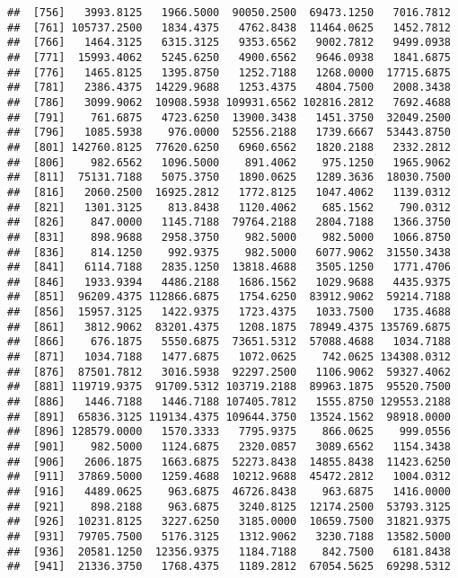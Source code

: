 \documentclass[]{article}
\begin{document}
\begin{verbatim}
##  [756]   3993.8125   1966.5000  90050.2500  69473.1250   7016.7812
##  [761] 105737.2500   1834.4375   4762.8438  11464.0625   1452.7812
##  [766]   1464.3125   6315.3125   9353.6562   9002.7812   9499.0938
##  [771]  15993.4062   5245.6250   4900.6562   9646.0938   1841.6875
##  [776]   1465.8125   1395.8750   1252.7188   1268.0000  17715.6875
##  [781]   2386.4375  14229.9688   1253.4375   4804.7500   2008.3438
##  [786]   3099.9062  10908.5938 109931.6562 102816.2812   7692.4688
##  [791]    761.6875   4723.6250  13900.3438   1451.3750  32049.2500
##  [796]   1085.5938    976.0000  52556.2188   1739.6667  53443.8750
##  [801] 142760.8125  77620.6250   6960.6562   1820.2188   2332.2812
##  [806]    982.6562   1096.5000    891.4062    975.1250   1965.9062
##  [811]  75131.7188   5075.3750   1890.0625   1289.3636  18030.7500
##  [816]   2060.2500  16925.2812   1772.8125   1047.4062   1139.0312
##  [821]   1301.3125    813.8438   1120.4062    685.1562    790.0312
##  [826]    847.0000   1145.7188  79764.2188   2804.7188   1366.3750
##  [831]    898.9688   2958.3750    982.5000    982.5000   1066.8750
##  [836]    814.1250    992.9375    982.5000   6077.9062  31550.3438
##  [841]   6114.7188   2835.1250  13818.4688   3505.1250   1771.4706
##  [846]   1933.9394   4486.2188   1686.1562   1029.9688   4435.9375
##  [851]  96209.4375 112866.6875   1754.6250  83912.9062  59214.7188
##  [856]  15957.3125   1422.9375   1723.4375   1033.7500   1735.4688
##  [861]   3812.9062  83201.4375   1208.1875  78949.4375 135769.6875
##  [866]    676.1875   5550.6875  73651.5312  57088.4688   1034.7188
##  [871]   1034.7188   1477.6875   1072.0625    742.0625 134308.0312
##  [876]  87501.7812   3016.5938  92297.2500   1106.9062  59327.4062
##  [881] 119719.9375  91709.5312 103719.2188  89963.1875  95520.7500
##  [886]   1446.7188   1446.7188 107405.7812   1555.8750 129553.2188
##  [891]  65836.3125 119134.4375 109644.3750  13524.1562  98918.0000
##  [896] 128579.0000   1570.3333   7795.9375    866.0625    999.0556
##  [901]    982.5000   1124.6875   2320.0857   3089.6562   1154.3438
##  [906]   2606.1875   1663.6875  52273.8438  14855.8438  11423.6250
##  [911]  37869.5000   1259.4688  10212.9688  45472.2812   1004.0312
##  [916]   4489.0625    963.6875  46726.8438    963.6875   1416.0000
##  [921]    898.2188    963.6875   3240.8125  12174.2500  53793.3125
##  [926]  10231.8125   3227.6250   3185.0000  10659.7500  31821.9375
##  [931]  79705.7500   5176.3125   1312.9062   3230.7188  13582.5000
##  [936]  20581.1250  12356.9375   1184.7188    842.7500   6181.8438
##  [941]  21336.3750   1768.4375   1189.2812  67054.5625  69298.5312

\end{verbatim}
\end{document}
